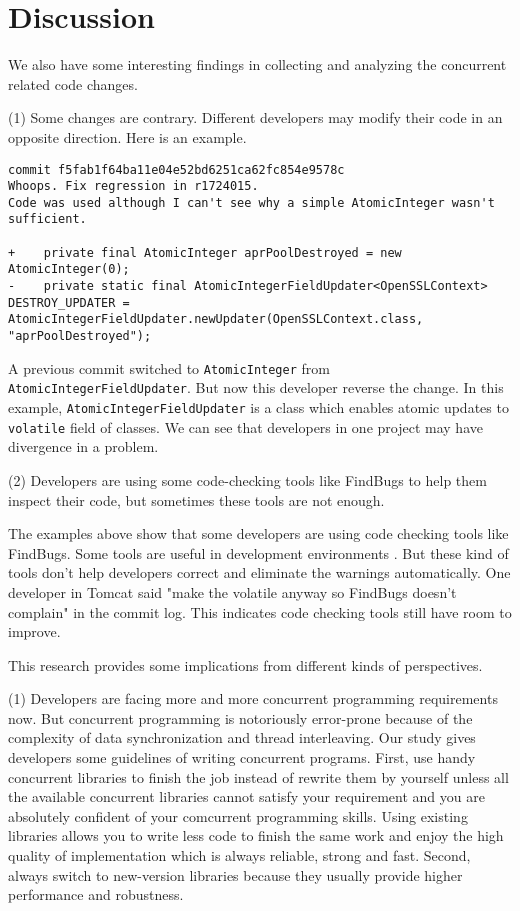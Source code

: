 \section{Discussion}
We also have some interesting findings in collecting and analyzing the concurrent related code changes.

(1) Some changes are contrary. Different developers may modify their code in an opposite direction. Here is an example.

\begin{lstlisting}
commit f5fab1f64ba11e04e52bd6251ca62fc854e9578c
Whoops. Fix regression in r1724015.
Code was used although I can't see why a simple AtomicInteger wasn't sufficient.

+    private final AtomicInteger aprPoolDestroyed = new AtomicInteger(0);
-    private static final AtomicIntegerFieldUpdater<OpenSSLContext> DESTROY_UPDATER = AtomicIntegerFieldUpdater.newUpdater(OpenSSLContext.class, "aprPoolDestroyed");
\end{lstlisting}

A previous commit switched to \texttt{AtomicInteger} from \texttt{AtomicIntegerFieldUpdater}. But now this developer reverse the change. In this example, \texttt{AtomicIntegerFieldUpdater} is a class which enables atomic updates to \texttt{volatile} field of classes. We can see that developers in one project may have divergence in a problem.

(2) Developers are using some code-checking tools like FindBugs to help them inspect their code, but sometimes these tools are not enough.

The examples above show that some developers are using code checking tools like FindBugs. Some tools are useful in development environments \cite{conf/oopsla/AyewahPMPZ07}. But these kind of tools don't help developers correct and eliminate the warnings automatically. One developer in Tomcat said "make the volatile anyway so FindBugs doesn't complain" in the commit log. This indicates code checking tools still have room to improve.

This research provides some implications from different kinds of perspectives.

(1) Developers are facing more and more concurrent programming requirements now. But concurrent programming is notoriously error-prone because of the complexity of data synchronization and thread interleaving. Our study gives developers some guidelines of writing concurrent programs. First, use handy concurrent libraries to finish the job instead of rewrite them by yourself unless all the available concurrent libraries cannot satisfy your requirement and you are absolutely confident of your comcurrent programming skills. Using existing libraries allows you to  write less code to finish the same work and enjoy the high quality of implementation which is always reliable, strong and fast. Second, always switch to new-version libraries because they usually provide higher performance and robustness.

